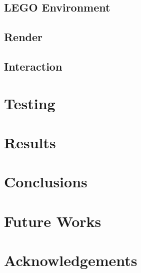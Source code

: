 \documentclass[a4paper]{article}
\begin{document}
        
        \subsection{LEGO Environment}
        
        
        \subsection{Render}
        
        
        \subsection{Interaction}
    
    \section{Testing}
    
    \section{Results}
    
    \section{Conclusions}
    
    \section{Future Works}
    
    \section{Acknowledgements}
    
    
    
    \nocite{*}
\end{document}
